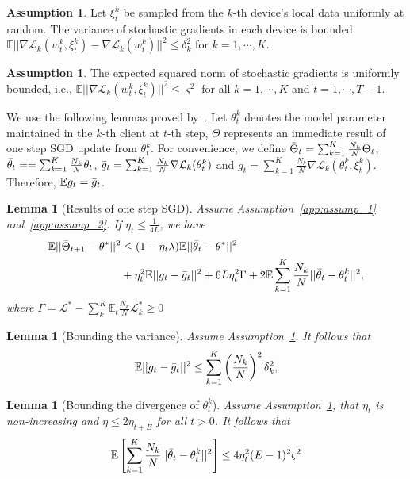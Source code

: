 \documentclass{article} %
\theoremstyle{plain}
\newtheorem{lemma}[theorem]{Lemma}
\theoremstyle{definition}
\newtheorem{assumption}[theorem]{Assumption}
\theoremstyle{remark}
\begin{document}
\begin{assumption}
\label{app:assump_3}
Let $\xi_t^k$ be sampled from the $k$-th device's local data uniformly at random. The variance of stochastic gradients in each device is bounded: $\mathbb{E}||\nabla \mathcal{L}_k(w_t^k,\xi_t^k)-\nabla \mathcal{L}_k(w_t^k)||^2\leq\delta_k^2$ for $k=1, \cdots, K$.
\end{assumption}

\begin{assumption}
\label{app:assump_4}
The expected squared norm of stochastic gradients is uniformly bounded, i.e., $\mathbb{E}||\nabla \mathcal{L}_k(w_t^k,\xi_t^k)||^2\leq \varsigma^2$ for all $k=1, \cdots, K$ and $t=1, \cdots, T-1$.
\end{assumption}
We use the following lemmas proved by~\citet{li2019convergence}. Let $\theta_t^k$ denotes the model parameter maintained in the $k$-th client at $t$-th step, $\Theta$ represents an immediate result of one step SGD update from $\theta_t^k$. For convenience, we define $\Bar{\Theta}_t=\sum_{k=1}^K\frac{N_k}{N}\Theta_t$, $\Bar{\theta}_t==\sum_{k=1}^K\frac{N_k}{N}\theta_t$, $\Bar{g}_t=\sum_{k=1}^K\frac{N_k}{N}\nabla \mathcal{L}_k(\theta_t^k)$ and $g_t = \sum_{k=1}^K\frac{N_k}{N}\nabla \mathcal{L}_k(\theta_t^k,\xi_t^k)$. Therefore, $\mathbb{E}g_t=\Bar{g}_t$.
\begin{lemma}[Results of one step SGD]
\label{app:lemma_1}
Assume Assumption~\ref{app:assump_1} and~\ref{app:assump_2}. If $\eta_t\leq\frac{1}{4L}$, we have
\begin{align}
    \mathbb{E}||\Bar{\Theta}_{t+1}-\theta^*||^2&\leq(1-\eta_t\lambda)\mathbb{E}||\Bar{\theta}_t-\theta^*||^2\\
    &+\eta_t^2\mathbb{E}||g_t-\Bar{g}_t||^2+6L\eta_t^2\Gamma+2\mathbb{E}\sum_{k=1}^K\frac{N_k}{N} ||\Bar{\theta}_t-\theta_t^k||^2,\nonumber
\end{align}
where $\Gamma=\mathcal{L}^{*}-\sum_k^K \mathbb{E}_t\frac{N_k}{N}\mathcal{L}_k^*\geq0$
\end{lemma}

\begin{lemma}[Bounding the variance]
\label{app:lemma_2}
Assume Assumption~\ref{app:assump_3}. It follows that
\begin{align}
    \mathbb{E}||g_t-\Bar{g}_t||^2 \leq \sum_{k=1}^K \left(\frac{N_k}{N}\right)^2 \delta_k^2,
\end{align}
\end{lemma}

\begin{lemma}[Bounding the divergence of {$\theta_t^k$}]
\label{app:lemma_3}
Assume Assumption~\ref{app:assump_4}, that $\eta_t$ is non-increasing and $\eta\leq2\eta_{t+E}$ for all $t>0$. It follows that
\begin{align}
    \mathbb{E}\left[\sum_{k=1}^K\frac{N_k}{N} ||\Bar{\theta}_t-\theta_t^k||^2\right]\leq 4\eta_t^2(E-1)^2\varsigma^2
\end{align}
\end{lemma}
\end{document}
